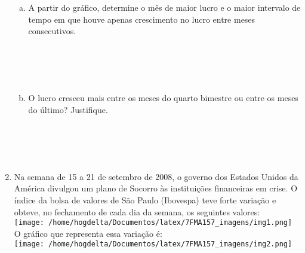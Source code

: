 \documentclass[a4paper,14pt]{article}
\begin{document}
\begin{multicols}{2}
\begin{enumerate}
\begin{enumerate}[a)]
				\item A partir do gráfico, determine o mês de maior lucro e o maior intervalo de tempo em que houve apenas crescimento no lucro entre meses consecutivos. \\\\\\\\\\
				\item O lucro cresceu mais entre os meses do quarto bimestre ou entre os meses do último? Justifique. \\\\\\\\\\
			\end{enumerate}
		    \item Na semana de 15 a 21 de setembro de 2008, o governo dos Estados Unidos da América divulgou um plano de Socorro às instituições financeiras em crise. O índice da bolsa de valores de São Paulo (Ibovespa) teve forte variação e obteve, no fechamento de cada dia da semana, os seguintes valores: \\
		    \texttt{[image: /home/hogdelta/Documentos/latex/7FMA157\_imagens/img1.png]} \\
		    O gráfico que representa essa variação é:\\
		    \texttt{[image: /home/hogdelta/Documentos/latex/7FMA157\_imagens/img2.png]} \\
		    

\end{enumerate}
\end{multicols}
\end{document}
